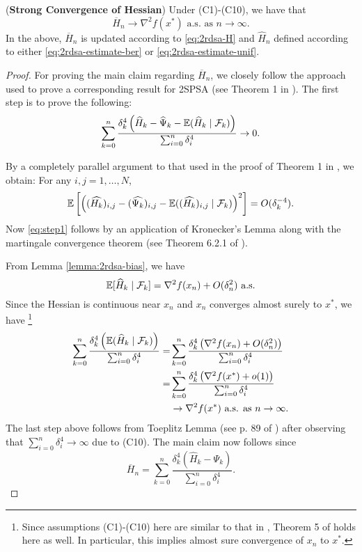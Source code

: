 \begin{theorem}(\textbf{Strong Convergence of Hessian})
\label{thm:2rdsa-H}
Under (C1)-(C10), we have that 
$$\overline H_n \rightarrow \nabla^2 f(x^*) \text{ a.s. as } n\rightarrow \infty.$$ 
In the above, $\overline H_n$ is updated according to \eqref{eq:2rdsa-H} and $\widehat H_n$ defined according to either \eqref{eq:2rdsa-estimate-ber} or \eqref{eq:2rdsa-estimate-unif}. 
\end{theorem}
\begin{proof}
For proving the main claim regarding $\overline H_n$, we closely follow the approach used to prove a corresponding result for 2SPSA (see Theorem 1 in \cite{spall-jacobian}). 
The first step is to prove the following:
\begin{align}
\sum_{k=0}^n \dfrac{\delta_k^4 \left(\widehat H_k - \widehat \Psi_k - \mathbb{E}(\widehat H_k \mid \mathcal{F}_k)\right)}{\sum_{i=0}^n \delta_i^4} \rightarrow 0.
\label{eq:step1}
\end{align}

By a completely parallel argument to that used in the proof of Theorem 1 in \cite{spall-jacobian}, we obtain: For any $i,j = 1,\ldots,N$,
\begin{align*}
\mathbb{E} \left[\left((\widehat {H_k})_{i,j} - (\widehat {\Psi_k})_{i,j} - \mathbb{E}((\widehat {H_k})_{i,j} \mid \mathcal{F}_k)\right)^2\right] = O(\delta_k^{-4}).
\end{align*}
Now \eqref{eq:step1} follows by an application of Kronecker's Lemma along with the martingale convergence theorem (see Theorem 6.2.1 of \cite{lahaprobability}).

From Lemma \ref{lemma:2rdsa-bias}, we have 
$$ \mathbb{E}[ \widehat H_k \mid \mathcal{F}_k] = \nabla^2 f(x_n) + O(\delta_n^2) \text{ a.s.}$$
Since the Hessian is continuous near $x_n$ and $x_n$ converges almost surely to $x^*$, we have
\footnote{Since assumptions (C1)-(C10) here are similar to that in \cite{prashanth2015rdsa}, Theorem 5 of \cite{prashanth2015rdsa} holds here as well. In particular, this implies almost sure convergence of $x_n$ to $x^*$.}
\begin{align*}
\sum_{k=0}^n \dfrac{\delta_k^4 \left(\mathbb{E}(\widehat H_k \mid \mathcal{F}_k)\right)}{\sum_{i=0}^n \delta_i^4} 
=&\sum_{k=0}^n \dfrac{\delta_k^4 \left(\nabla^2 f(x_n) + O(\delta_n^2)\right)}{\sum_{i=0}^n \delta_i^4}\\
=&\sum_{k=0}^n \dfrac{\delta_k^4 \left(\nabla^2 f(x^*) + o(1)\right)}{\sum_{i=0}^n \delta_i^4}\\
&\rightarrow \nabla^2 f(x^*) \text{ a.s. as } n \rightarrow \infty.
\end{align*}
The last step above follows from Toeplitz Lemma (see p. 89 of \cite{lahaprobability}) after observing that $\sum_{i=0}^n \delta_i^4 \rightarrow \infty$ due to (C10). 
The main claim now follows since 
$$ \overline H_n = \sum_{k=0}^n \dfrac{\delta_k^4 \left(\widehat H_k - \Psi_k \right)}{\sum_{i=0}^n \delta_i^4}.$$
\end{proof}


